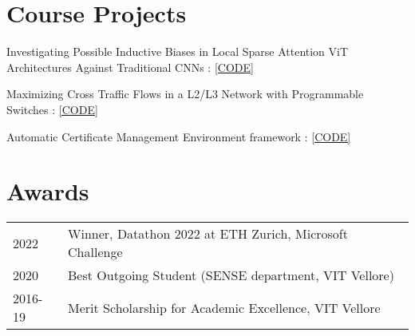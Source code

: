 \documentclass[]{onepage}
\begin{document}
\begin{minipage}[t]{0.66\textwidth}
\section{Course Projects}
\vspace{0.2cm}
\begin{tightemize}
\item Investigating Possible Inductive Biases in Local Sparse Attention ViT Architectures Against Traditional CNNs :  {\href{https://github.com/Siddhant-Ray/Deep-Learning-Project-2021}{[CODE]}}
\item Maximizing Cross Traffic Flows in a L2/L3 Network with Programmable Switches : {\href{https://github.com/Siddhant-Ray/Advnet-Project-ETH}{[CODE]}}
\item Automatic Certificate Management Environment framework : {\href{https://github.com/Siddhant-Ray/NetworkSecurity-ACME-Project}{[CODE]}}
\end{tightemize}

\vspace{-0.1cm}
\section{Awards} 
\begin{tabular}{ll}
2022         & Winner, Datathon 2022 at ETH Zurich, Microsoft Challenge \\
2020	     &  Best Outgoing Student (SENSE department, VIT Vellore)\\
2016-19      & Merit Scholarship for Academic Excellence, VIT Vellore
\end{tabular}
\sectionsep

\end{minipage} 
\end{document}
